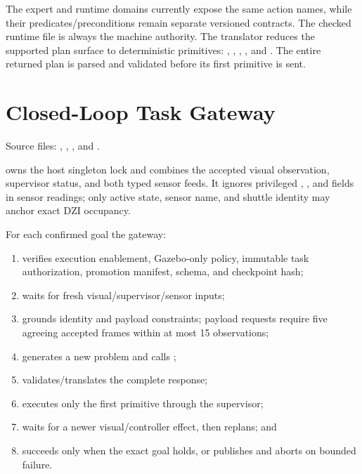 The expert and runtime domains currently expose the same action names, while
their predicates/preconditions remain separate versioned contracts. The
checked runtime file is always the machine authority. The translator reduces
the supported plan surface to
deterministic primitives: , ,
, , and . The entire returned plan
is parsed and validated before its first primitive is sent.

\section{Closed-Loop Task Gateway}

Source files: ,
,
, and
.

 owns the host singleton lock and combines
the accepted visual observation, supervisor status, and both typed sensor
feeds. It ignores privileged , , and 
fields in sensor readings; only active state, sensor name, and shuttle identity
may anchor exact DZI occupancy.

For each confirmed goal the gateway:

\begin{enumerate}
  \item verifies execution enablement, Gazebo-only policy, immutable task
        authorization, promotion manifest, schema, and checkpoint hash;
  \item waits for fresh visual/supervisor/sensor inputs;
  \item grounds identity and payload constraints; payload requests require five
        agreeing accepted frames within at most 15 observations;
  \item generates a new problem and calls ;
  \item validates/translates the complete response;
  \item executes only the first primitive through the supervisor;
  \item waits for a newer visual/controller effect, then replans; and
  \item succeeds only when the exact goal holds, or publishes 
        and aborts on bounded failure.
\end{enumerate}

